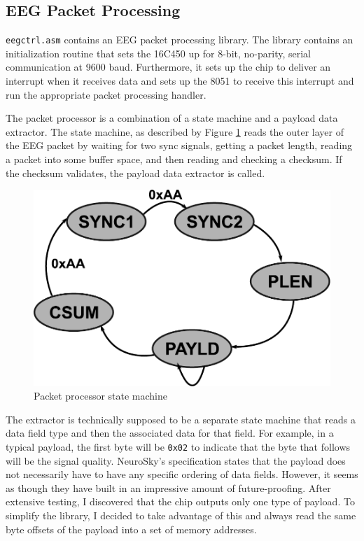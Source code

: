 \documentclass[letterpaper,10pt,notitlepage]{report}
\newcommand{\dat}[1]{\texttt{#1}}
\begin{document}
    \subsection{EEG Packet Processing}
        \label{sec:packetprocessing}

        \dat{eegctrl.asm} contains an EEG packet processing library.  The
        library contains an initialization routine that sets the 16C450 up for
        8-bit, no-parity, serial communication at 9600 baud.  Furthermore, it
        sets up the chip to deliver an interrupt when it receives data and sets
        up the 8051 to receive this interrupt and run the appropriate packet
        processing handler.

        The packet processor is a combination of a state machine and a payload
        data extractor.  The state machine, as described by Figure \ref{fig:sm}
        reads the outer layer of the EEG packet by waiting for two sync
        signals, getting a packet length, reading a packet into some buffer
        space, and then reading and checking a checksum.  If the checksum
        validates, the payload data extractor is called.

        \begin{figure}[h!]
        \begin{center}
            \includegraphics[scale=.4]{fig/sm.pdf}
            \caption{Packet processor state machine}
            \label{fig:sm}
        \end{center}
        \end{figure}

        The extractor is technically supposed to be a separate state machine
        that reads a data field type and then the associated data for that
        field.  For example, in a typical payload, the first byte will be
        \dat{0x02} to indicate that the byte that follows will be the signal
        quality.  NeuroSky's specification states that the payload does not
        necessarily have to have any specific ordering of data fields.
        However, it seems as though they have built in an impressive amount of
        future-proofing.  After extensive testing, I discovered that the chip
        outputs only one type of payload.  To simplify the library, I decided
        to take advantage of this and always read the same byte offsets of the
        payload into a set of memory addresses.
\end{document}
